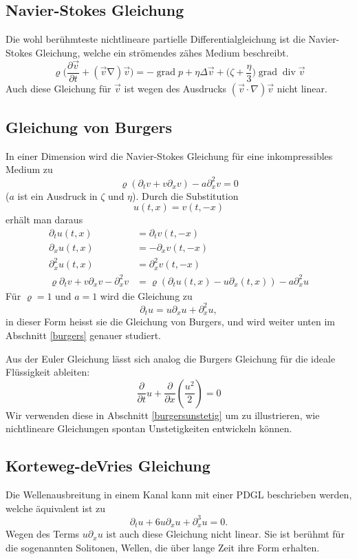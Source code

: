 \subsection{Navier-Stokes Gleichung}
Die wohl berühmteste nichtlineare partielle Differentialgleichung ist
die Navier-Stokes Gleichung, welche ein strömendes zähes Medium beschreibt.
\[
\varrho\biggl(
\frac{\partial \vec v}{\partial t}+(\vec v\operatorname \nabla)\vec v
\biggr)
=
-\operatorname{grad}p
+\eta\Delta \vec v+\biggl(\zeta+\frac{\eta}3\biggr)\operatorname{grad}\operatorname{div}\vec v
\]
Auch diese Gleichung für $\vec v$ ist wegen des Ausdrucks $(\vec v\cdot\nabla)\vec v$
nicht linear.

\subsection{Gleichung von Burgers}
In einer Dimension  wird die Navier-Stokes Gleichung für eine inkompressibles
Medium zu
\[
\varrho(\partial_t v+v\partial_x v)-a\partial_x^2v=0
\]
($a$ ist ein Ausdruck in $\zeta$ und $\eta$).
Durch die Substitution
\[
u(t,x)=v(t,-x)
\]
erhält man daraus 
\begin{align*}
\partial_tu(t,x)&=\partial_tv(t,-x)\\
\partial_xu(t,x)&=-\partial_xv(t,-x)\\
\partial_x^2u(t,x)&=\partial_x^2v(t,-x)\\
\varrho
\partial_t v+v\partial_x v-\partial_x^2v
&=
\varrho(\partial_tu(t,x)-u\partial_x(t,x))-a\partial_x^2u
\end{align*}
Für $\varrho=1$ und $a=1$ wird die Gleichung zu
\[
\partial_tu=u\partial_xu+\partial_x^2u,
\]
in dieser Form heisst sie die Gleichung von Burgers,
und wird weiter unten im Abschnitt
\ref{burgers} genauer studiert.

Aus der Euler Gleichung lässt sich analog die Burgers Gleichung
für die ideale Flüssigkeit ableiten:
\[
\frac{\partial}{\partial t}u+\frac{\partial}{\partial x}\left(\frac{u^2}2\right)
=0
\]
Wir verwenden diese in Abschnitt \ref{burgersunstetig} um zu illustrieren,
wie nichtlineare Gleichungen spontan Unstetigkeiten entwickeln können.

\subsection{Korteweg-deVries Gleichung}
Die Wellenausbreitung in einem Kanal kann mit einer PDGL beschrieben werden,
welche äquivalent ist zu
\[
\partial_tu+6u\partial_xu+\partial_x^3u=0.
\]
Wegen des Terms $u\partial_xu$ ist auch diese Gleichung nicht linear.
Sie ist berühmt für die sogenannten Solitonen, Wellen, die über
lange Zeit ihre Form erhalten.

